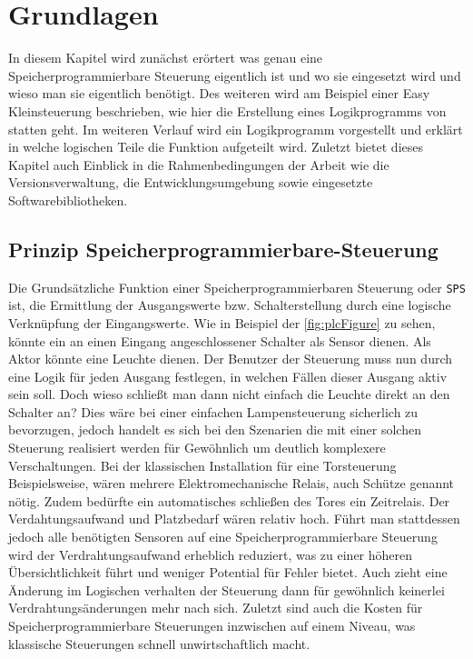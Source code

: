 \section{Grundlagen}\label{kap:grund}
In diesem Kapitel wird zunächst erörtert was genau eine Speicherprogrammierbare Steuerung eigentlich ist und wo sie eingesetzt wird und wieso man sie eigentlich benötigt. Des weiteren wird am Beispiel einer Easy Kleinsteuerung beschrieben, wie hier die Erstellung eines Logikprogramms von statten geht. Im weiteren Verlauf wird ein Logikprogramm vorgestellt und erklärt in welche logischen Teile die Funktion aufgeteilt wird. Zuletzt bietet dieses Kapitel auch Einblick in die Rahmenbedingungen der Arbeit wie die Versionsverwaltung, die Entwicklungsumgebung sowie eingesetzte Softwarebibliotheken. 
\subsection{Prinzip Speicherprogrammierbare-Steuerung}
Die Grundsätzliche Funktion einer Speicherprogrammierbaren Steuerung oder \texttt{SPS} ist, die Ermittlung der Ausgangswerte bzw. Schalterstellung durch eine logische Verknüpfung der Eingangswerte.\cite{BOOK:SPS} Wie in Beispiel der \autoref{fig:plcFigure} zu sehen, könnte ein an einen Eingang angeschlossener Schalter als Sensor dienen. Als Aktor könnte eine Leuchte dienen. Der Benutzer der Steuerung muss nun durch eine Logik für jeden Ausgang festlegen, in welchen Fällen dieser Ausgang aktiv sein soll. Doch wieso schließt man dann nicht einfach die Leuchte direkt an den Schalter an? Dies wäre bei einer einfachen Lampensteuerung sicherlich zu bevorzugen, jedoch handelt es sich bei den Szenarien die mit einer solchen Steuerung realisiert werden für Gewöhnlich um deutlich komplexere Verschaltungen. Bei der klassischen Installation für eine Torsteuerung Beispielsweise, wären mehrere Elektromechanische Relais, auch Schütze genannt nötig. Zudem bedürfte ein automatisches schließen des Tores ein Zeitrelais. Der Verdahtungsaufwand und Platzbedarf wären relativ hoch. Führt man stattdessen jedoch alle benötigten Sensoren auf eine Speicherprogrammierbare Steuerung wird der Verdrahtungsaufwand erheblich reduziert, was zu einer höheren Übersichtlichkeit führt und weniger Potential für Fehler bietet. Auch zieht eine Änderung im Logischen verhalten der Steuerung dann für gewöhnlich keinerlei Verdrahtungsänderungen mehr nach sich. Zuletzt sind auch die Kosten für Speicherprogrammierbare Steuerungen inzwischen auf einem Niveau, was klassische Steuerungen schnell unwirtschaftlich macht. 
\newcommand*{\quelle}{%
	\footnotesize Quelle: 
} 

